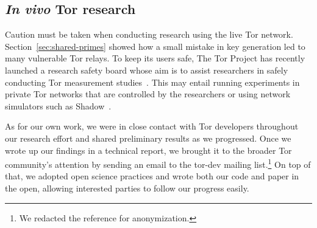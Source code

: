 
\subsection{\textit{In vivo} Tor research}
Caution must be taken when conducting research using the live Tor network.
Section~\ref{sec:shared-primes} showed how a small mistake in key generation led
to many vulnerable Tor relays.  To keep its users safe, The Tor Project has
recently launched a research safety board whose aim is to assist researchers in
safely conducting Tor measurement studies~\cite{safety-board}.  This may entail
running experiments in private Tor networks that are controlled by the
researchers or using network simulators such as Shadow~\cite{Jansen2012a}.

As for our own work, we were in close contact with Tor developers throughout our
research effort and shared preliminary results as we progressed.  Once we wrote
up our findings in a technical report, we brought it to the broader Tor
community's attention by sending an email to the tor-dev mailing
list.\footnote{We redacted the reference for anonymization.}  On top of that, we
adopted open science practices and wrote both our code and paper in the open,
allowing interested parties to follow our progress easily.

